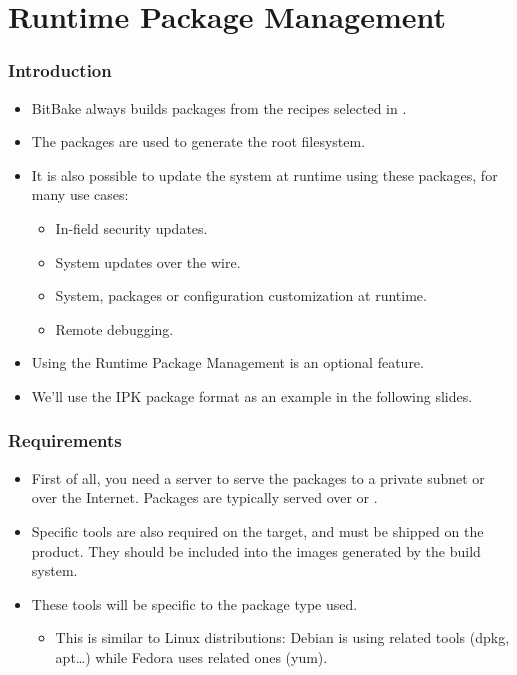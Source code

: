 \section{Runtime Package Management}

\begin{frame}
  \frametitle{Introduction}
  \begin{itemize}
    \item BitBake always builds packages from the recipes selected in
      .
    \item The packages are used to generate the root filesystem.
    \item It is also possible to update the system at runtime using these
      packages, for many use cases:
      \begin{itemize}
        \item In-field security updates.
        \item System updates over the wire.
        \item System, packages or configuration customization at
          runtime.
        \item Remote debugging.
      \end{itemize}
    \item Using the Runtime Package Management is an optional feature.
    \item We'll use the IPK package format as an example in the
      following slides.
  \end{itemize}
\end{frame}

\begin{frame}
  \frametitle{Requirements}
  \begin{itemize}
    \item First of all, you need a server to serve the packages to a
      private subnet or over the Internet. Packages are typically
      served over  or .
    \item Specific tools are also required on the target, and must be
      shipped on the product. They should be included into the images
      generated by the build system.
    \item These tools will be specific to the package type used.
      \begin{itemize}
        \item This is similar to Linux distributions: Debian is using
           related tools (dpkg, apt\dots) while Fedora uses
           related ones (yum).
      \end{itemize}
  \end{itemize}
\end{frame}

